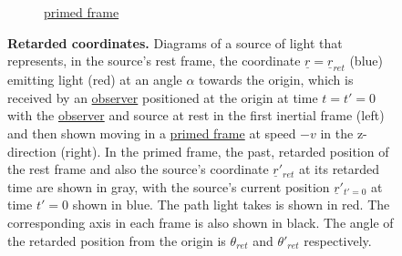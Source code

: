 \begin{figure}[ht]
\begin{subfigure}[b]{.49\textwidth}
		\caption{\hyperlink{def-Primed-Frame}{primed frame}}
	\end{subfigure}
	\caption{\textbf{Retarded coordinates.} Diagrams of a source of light that represents, in the source's rest frame, the coordinate ${\underline{r}} = {\underline{r}_{ret}}$ (blue) emitting light (red) at an angle ${\alpha}$ towards the origin, which is received by an \protect\hyperlink{def-observer}{observer} positioned at the origin at time ${t} = {t{'}} = 0$ with the \protect\hyperlink{def-observer}{observer} and source at rest in the first inertial frame (left) and then shown moving in a \protect\hyperlink{def-Primed-Frame}{primed frame} at speed $-{v}$ in the z-direction (right). In the primed frame, the past, retarded position of the rest frame and also the source's coordinate ${\underline{r}'_{ret}}$ at its retarded time are shown in gray, with the source's current position $\underline{r}'_{t' = 0}$ at time ${t{'}}=0$ shown in blue. The path light takes is shown in red. The corresponding axis in each frame is also shown in black. The angle of the retarded position from the origin is ${\theta_{ret}}$ and ${\theta'_{ret}}$ respectively.}
	\label{fig: Retarded field}
\end{figure}

